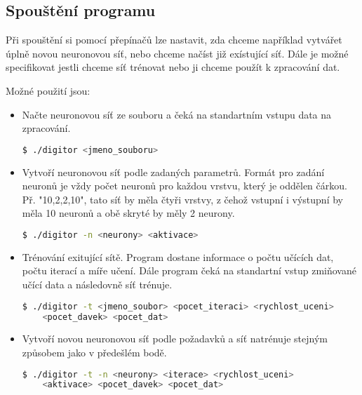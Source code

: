 \subsection{Spouštění programu}
Při spouštění si pomocí přepínačů lze nastavit, zda chceme například vytvářet úplně novou neuronovou síť, nebo chceme načíst již exístující síť. Dále je možné specifikovat jestli chceme síť trénovat nebo ji chceme použít k zpracování dat.

Možné použití jsou:
\begin{itemize}
    \item Načte neuronovou síť ze souboru a čeká na standartním vstupu data na zpracování.
    \begin{lstlisting}[language=bash, backgroundcolor=\color{backcolor}]
 $ ./digitor <jmeno_souboru>
    \end{lstlisting}

    \item Vytvoří neuronovou síť podle zadaných parametrů.
    Formát pro zadání neuronů je vždy počet neuronů pro každou vrstvu, který je oddělen čárkou.
    Př. "10,2,2,10", tato síť by měla čtyři vrstvy, z čehož vstupní i výstupní by měla 10 neuronů a obě skryté by měly 2 neurony.
    \begin{lstlisting}[language=bash, backgroundcolor=\color{backcolor}]
 $ ./digitor -n <neurony> <aktivace>
    \end{lstlisting}

    \item Trénování exitující sítě. Program dostane informace o počtu učících dat, počtu iterací a míře učení.
    Dále program čeká na standartní vstup zmiňované učící data a následovně síť trénuje.
    \begin{lstlisting}[language=bash, backgroundcolor=\color{backcolor}]
 $ ./digitor -t <jmeno_soubor> <pocet_iteraci> <rychlost_uceni>
    <pocet_davek> <pocet_dat>
    \end{lstlisting}

    \item Vytvoří novou neuronovou síť podle požadavků a síť natrénuje stejným způsobem jako v předešlém bodě.
    \begin{lstlisting}[language=bash, backgroundcolor=\color{backcolor}]
 $ ./digitor -t -n <neurony> <iterace> <rychlost_uceni>
    <aktivace> <pocet_davek> <pocet_dat>
    \end{lstlisting}
\end{itemize}
